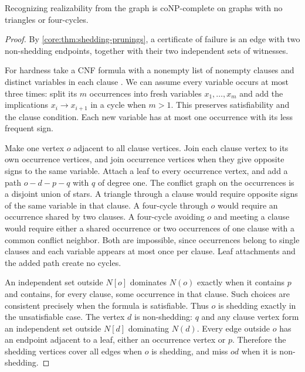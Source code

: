 \begin{corollary}
\label{core:cor:shedding-pruning-complexity}
Recognizing realizability from the graph is coNP-complete on graphs
with no triangles or four-cycles.
\end{corollary}
\begin{proof}
By \cref{core:thm:shedding-prunings}, a certificate of failure is
an edge with two non-shedding endpoints, together with their two
independent sets of witnesses.

For hardness take a CNF formula with a nonempty list of nonempty
clauses and distinct variables in each clause
\cite{Cook1971}. We can assume every variable occurs at most three
times: split its $m$ occurrences into fresh variables
$x_1,\ldots,x_m$ and add the implications $x_i\to x_{i+1}$ in a
cycle when $m>1$. This preserves satisfiability and the clause
condition. Each new variable has at most one occurrence with its
less frequent sign.

Make one vertex $o$ adjacent to all clause vertices. Join each
clause vertex to its own occurrence vertices, and join occurrence
vertices when they give opposite signs to the same variable.
Attach a leaf to every occurrence vertex, and add a path $o-d-p-q$
with $q$ of degree one. The conflict graph on the occurrences is a
disjoint union of stars. A triangle through a clause would require
opposite signs of the same variable in that clause. A four-cycle
through $o$ would require an occurrence shared by two clauses.
A four-cycle avoiding $o$ and meeting a clause would require either
a shared occurrence or two occurrences of one clause with a
common conflict neighbor. Both are impossible, since occurrences
belong to single clauses and each variable appears at most once
per clause. Leaf attachments and the added path create no cycles.

An independent set outside $N[o]$ dominates $N(o)$ exactly when it
contains $p$ and contains, for every clause, some occurrence in
that clause. Such choices are consistent precisely when the
formula is satisfiable. Thus $o$ is shedding exactly in the
unsatisfiable case. The vertex $d$ is non-shedding: $q$ and any
clause vertex form an independent set outside $N[d]$ dominating
$N(d)$. Every edge outside $o$ has an endpoint adjacent to a leaf,
either an occurrence vertex or $p$. Therefore the shedding
vertices cover all edges when $o$ is shedding, and miss $od$ when
it is non-shedding.
\end{proof}

